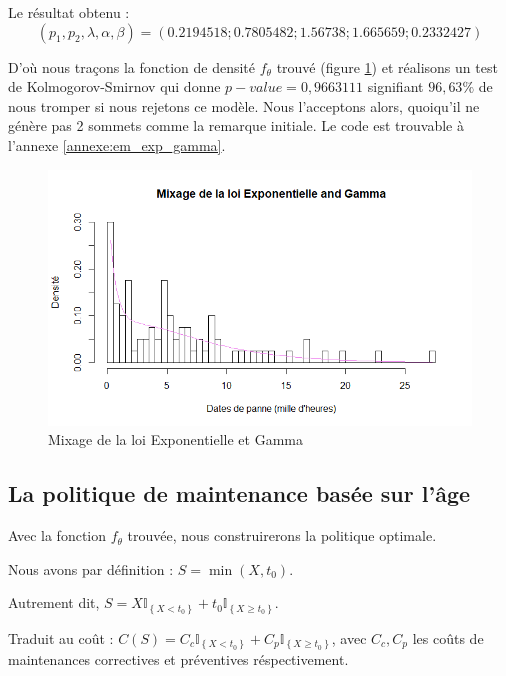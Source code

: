 \documentclass[10pt,a4paper]{article}
\begin{document}
Le résultat obtenu :
\[\left( {{p_1},{p_2},\lambda ,\alpha ,\beta } \right) = \left( {0.2194518;0.7805482;1.56738;1.665659;0.2332427} \right)\]

D'où nous traçons la fonction de densité $f_\theta$ trouvé (figure \ref{mixage}) et réalisons un test de Kolmogorov-Smirnov qui donne $p-value=0,9663111$ signifiant $96,63\%$ de nous tromper si nous rejetons ce modèle. Nous l'acceptons alors, quoiqu'il ne génère pas 2 sommets comme la remarque initiale. Le code est trouvable à l'annexe \ref{annexe:em_exp_gamma}.

\begin{figure}[!hbt]
    \centering
    \includegraphics[width=\textwidth]{EM_Exp_Gamma.png}
    \caption{Mixage de la loi Exponentielle et Gamma}
    \label{mixage}
\end{figure}

\subsection{La politique de maintenance basée sur l'âge}

Avec la fonction $f_\theta$ trouvée, nous construirerons la politique optimale.

Nous avons par définition : $S = \min \left( {X,{t_0}} \right)$.

Autrement dit, $S = X{\mathbb{I}_{\left\{ {X < {t_0}} \right\}}} + {t_0}{\mathbb{I}_{\left\{ {X \geqslant {t_0}} \right\}}}$.

Traduit au coût : $C\left( S \right) = {C_c}{\mathbb{I}_{\left\{ {X < {t_0}} \right\}}} + {C_p}{\mathbb{I}_{\left\{ {X \geqslant {t_0}} \right\}}}$, avec $C_c, C_p$ les coûts de maintenances correctives et préventives réspectivement.
\end{document}
